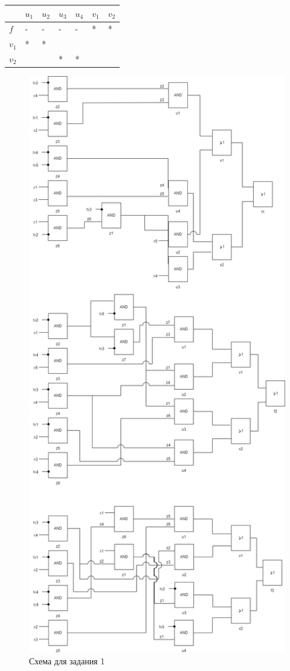\begin{longtable}[]{@{}lllllll@{}}
\toprule
& \(u_1\) & \(u_2\) & \(u_3\) & \(u_4\) & \(v_1\) &
\(v_2\)\tabularnewline
\midrule
\endhead
\(f\) & - & - & - & - & * & *\tabularnewline
\(v_1\) & * & * & & & &\tabularnewline
\(v_2\) & & & * & * & &\tabularnewline
\bottomrule
\end{longtable}

\begin{figure}
\centering
\includegraphics{./files/task1.png}
\caption{Схема для задания 1}
\end{figure}

